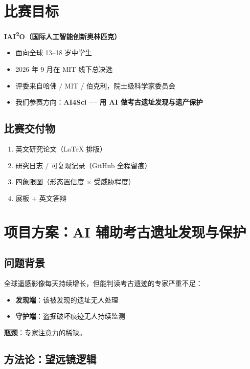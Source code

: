 \documentclass[11pt]{article}
\begin{document}
\section{比赛目标}

\textbf{IAI\textsuperscript{2}O（国际人工智能创新奥林匹克）}

\begin{itemize}
    \item 面向全球 13--18 岁中学生
    \item 2026 年 9 月在 MIT 线下总决选
    \item 评委来自哈佛 / MIT / 伯克利，院士级科学家委员会
    \item 我们参赛方向：\textbf{AI4Sci --- 用 AI 做考古遗址发现与遗产保护}
\end{itemize}

\subsection*{比赛交付物}

\begin{enumerate}
    \item 英文研究论文（LaTeX 排版）
    \item 研究日志 / 可复现记录（GitHub 全程留痕）
    \item 四象限图（形态置信度 $\times$ 受威胁程度）
    \item 展板 + 英文答辩
\end{enumerate}

\section{项目方案：AI 辅助考古遗址发现与保护}

\subsection*{问题背景}

全球遥感影像每天持续增长，但能判读考古遗迹的专家严重不足：

\begin{itemize}
    \item \textbf{发现端}：该被发现的遗址无人处理
    \item \textbf{守护端}：盗掘破坏痕迹无人持续监测
\end{itemize}

\textbf{瓶颈}：专家注意力的稀缺。

\subsection*{方法论：望远镜逻辑}
\end{document}
